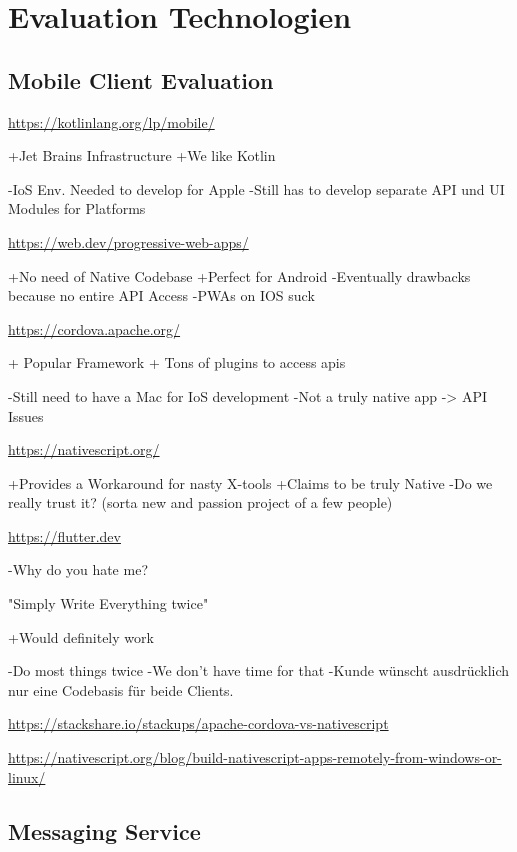 \section{Evaluation Technologien}\label{sec:evaluation-technologien}

\subsection{Mobile Client Evaluation}\label{subsec:mobile-client-eval}



\url{https://kotlinlang.org/lp/mobile/}
	

    +Jet Brains Infrastructure 
    +We like Kotlin 

    -IoS Env. Needed to develop for Apple 
    -Still has to develop separate API und UI Modules for Platforms 

\url{https://web.dev/progressive-web-apps/ }
	
    +No need of Native Codebase
    +Perfect for Android 
    -Eventually drawbacks because no entire API Access 
    -PWAs on IOS suck

\url{https://cordova.apache.org/} 
	

    + Popular Framework 
    + Tons of plugins to access apis 

    -Still need to have a Mac for IoS development  
    -Not a truly native app -> API Issues
 

\url{https://nativescript.org/ }

    +Provides a Workaround for nasty X-tools 
    +Claims to be truly Native 
    -Do we really trust it? (sorta new and passion project of a few people) 

 
 \url{https://flutter.dev}

    -Why do you hate me?


"Simply Write Everything twice"

    +Would definitely work

    -Do most things twice
    -We don't have time for that
    -Kunde wünscht ausdrücklich nur eine Codebasis für beide Clients.

\url{https://stackshare.io/stackups/apache-cordova-vs-nativescript}

\url{https://nativescript.org/blog/build-nativescript-apps-remotely-from-windows-or-linux/ }

\subsection{Messaging Service}\label{subsec:messaging-eval}

